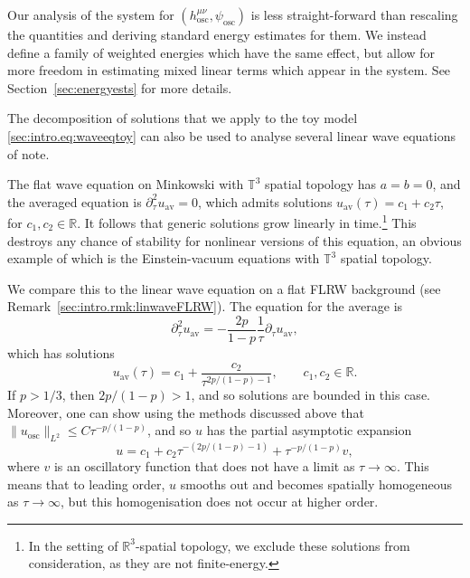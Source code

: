 \documentclass{article}
\newcommand{\RR}{\mathbb{R}}
\newcommand{\TT}{\mathbb{T}}
\newcommand{\osc}{\mathrm{osc}}
\newcommand{\av}{\mathrm{av}}
\newcommand{\pa}{\partial}
\newcommand{\ra}{\rightarrow}
\begin{document}
\begin{remark}
    Our analysis of the system for $(h_{\osc}^{\mu\nu},\psi_{\osc})$ is less straight-forward than rescaling the quantities and deriving standard energy estimates for them. We instead define a family of weighted energies which have the same effect, but allow for more freedom in estimating mixed linear terms which appear in the system. See Section~\ref{sec:energyests} for more details.
\end{remark}
\begin{remark}
    The decomposition of solutions that we apply to the toy model \eqref{sec:intro.eq:waveeqtoy} can also be used to analyse several linear wave equations of note.
    
    The flat wave equation on Minkowski with $\TT^3$ spatial topology has $a=b=0$, and the averaged equation is $\pa_\tau^2 u_\av = 0$, which admits solutions $u_\av(\tau) = c_1 + c_2 \tau$, for $c_1,c_2\in \RR$. It follows that generic solutions grow linearly in time.\footnote{In the setting of $\RR^3$-spatial topology, we exclude these solutions from consideration, as they are not finite-energy.} This destroys any chance of stability for nonlinear versions of this equation, an obvious example of which is the Einstein-vacuum equations with $\TT^3$ spatial topology.
    
    We compare this to the linear wave equation on a flat FLRW background (see Remark~\ref{sec:intro.rmk:linwaveFLRW}). The equation for the average is
    \begin{equation}
        \pa_\tau^2 u_\av = -\frac{2p}{1-p}\frac{1}{\tau}\pa_\tau u_\av,
    \end{equation}
    which has solutions
    \begin{equation}
        u_\av(\tau) = c_1 + \frac{c_2}{\tau^{2p/(1-p)-1}},\qquad c_1,c_2 \in \RR.
    \end{equation}
    If $p > 1/3$, then $2p/(1-p) > 1$, and so solutions are bounded in this case. Moreover, one can show using the methods discussed above that $\|u_\osc\|_{L^2} \leq C\tau^{-p/(1-p)}$, and so $u$ has the partial asymptotic expansion
    \begin{equation}
        u = c_1 + c_2\tau^{-(2p/(1-p)-1)} + \tau^{-p/(1-p)}v,
    \end{equation}
    where $v$ is an oscillatory function that does not have a limit as $\tau \ra \infty$. This means that to leading order, $u$ smooths out and becomes spatially homogeneous as $\tau \ra \infty$, but this homogenisation does not occur at higher order.
\end{remark}
\end{document}
